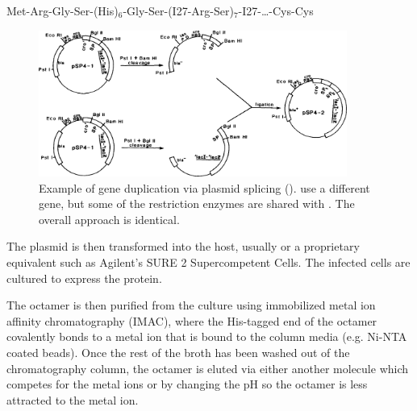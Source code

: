 \begin{center}
  Met-Arg-Gly-Ser-(His)$_6$-Gly-Ser-(I27-Arg-Ser)$_7$-I27-\ldots-Cys-Cys
  \label{eq:I27}
\end{center}

\begin{figure}
  \includegraphics[width=0.9\textwidth]{figures/binary/kempe85-fig2}%
  \caption{Example of gene duplication via plasmid splicing
    ().  \citet{kempe85} use a different
    gene, but some of the restriction enzymes are shared with
    \citet{carrion-vazquez99b}.  The overall approach is
    identical.\label{fig:plasmid}}
\end{figure}

The plasmid is then transformed into the host, usually
\citep{carrion-vazquez99b,bartels03,ma10} or
a proprietary equivalent such as Agilent's SURE 2 Supercompetent
Cells\citep{agilent-sure2,carrion-vazquez00}.  The infected cells are
cultured to express the protein.
%

The octamer is then purified from the culture using immobilized metal
ion affinity chromatography (IMAC), where the His-tagged end of the
octamer covalently bonds to a metal ion that is bound to the column
media (e.g. Ni-NTA coated
beads)\citep{carrion-vazquez00,bartels03,ma10}.  Once the rest of the
broth has been washed out of the chromatography column, the octamer is
eluted via either another molecule which competes for the metal
ions\citep{ma10} or by changing the pH so the octamer is less
attracted to the metal ion.
%

